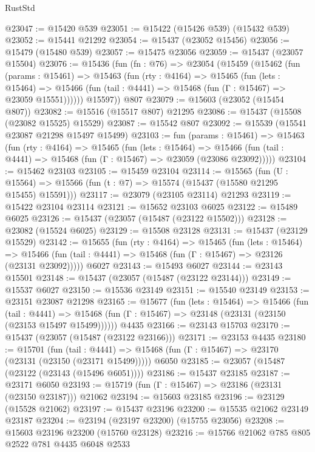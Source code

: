 \begin{lexlean}{RustStd}
\begin{coremodule}
@23047 := @15420 @539
@23051 := @15422 (@15426 @539) (@15432 @539)
@23052 := @15441 @21292
@23054 := @15437 (@23052 @15456)
@23056 := @15479 (@15480 @539)
@23057 := @15475 @23056
@23059 := @15437 (@23057 @15504)
@23076 := @15436
    (fun (fn : @76) =>
    @23054
      (@15459
        (@15462
          (fun (params : @15461) =>
          @15463
            (fun (rty : @4164) =>
            @15465
              (fun (lets : @15464) =>
              @15466 (fun (tail : @4441) => @15468 (fun (Γ : @15467) => @23059 @15551))))))
        @15597))
    @807
@23079 := @15603 (@23052 (@15454 @807))
@23082 := @15516 (@15517 @807) @21295
@23086 := @15437 (@15508 (@23082 @15525) @15529)
@23087 := @15542 @807
@23092 := @15539 (@15541 @23087 @21298 @15497 @15499)
@23103 := fun (params : @15461) =>
  @15463
    (fun (rty : @4164) =>
    @15465
      (fun (lets : @15464) =>
      @15466 (fun (tail : @4441) => @15468 (fun (Γ : @15467) => @23059 (@23086 @23092)))))
@23104 := @15462 @23103
@23105 := @15459 @23104
@23114 := @15565
    (fun (U : @15564) => @15566 (fun (t : @7) => @15574 (@15437 (@15580 @21295 @15455) @15591)))
@23117 := @23079 (@23105 @23114) @21293
@23119 := @15422 @23104 @23114
@23121 := @15652 @23103 @6025
@23122 := @15489 @6025
@23126 := @15437 (@23057 (@15487 (@23122 @15502)))
@23128 := @23082 (@15524 @6025)
@23129 := @15508 @23128
@23131 := @15437 (@23129 @15529)
@23142 := @15655
    (fun (rty : @4164) =>
    @15465
      (fun (lets : @15464) =>
      @15466 (fun (tail : @4441) => @15468 (fun (Γ : @15467) => @23126 (@23131 @23092)))))
    @6027
@23143 := @15493 @6027
@23144 := @23143 @15501
@23148 := @15437 (@23057 (@15487 (@23122 @23144)))
@23149 := @15537 @6027
@23150 := @15536 @23149
@23151 := @15540 @23149
@23153 := @23151 @23087 @21298
@23165 := @15677
    (fun (lets : @15464) =>
    @15466
      (fun (tail : @4441) =>
      @15468 (fun (Γ : @15467) => @23148 (@23131 (@23150 (@23153 @15497 @15499))))))
    @4435
@23166 := @23143 @15703
@23170 := @15437 (@23057 (@15487 (@23122 @23166)))
@23171 := @23153 @4435
@23180 := @15701
    (fun (tail : @4441) => @15468 (fun (Γ : @15467) => @23170 (@23131 (@23150 (@23171 @15499)))))
    @6050
@23185 := @23057 (@15487 (@23122 (@23143 (@15496 @6051))))
@23186 := @15437 @23185
@23187 := @23171 @6050
@23193 := @15719 (fun (Γ : @15467) => @23186 (@23131 (@23150 @23187))) @21062
@23194 := @15603 @23185
@23196 := @23129 (@15528 @21062)
@23197 := @15437 @23196
@23200 := @15535 @21062 @23149 @23187
@23204 := @23194 (@23197 @23200) (@15755 @23056)
@23208 := @15603 @23196 @23200 (@15760 @23128)
@23216 := @15766 @21062 @785 @805 @2522 @781 @4435 @6048 @2533

\end{coremodule}
\end{lexlean}
